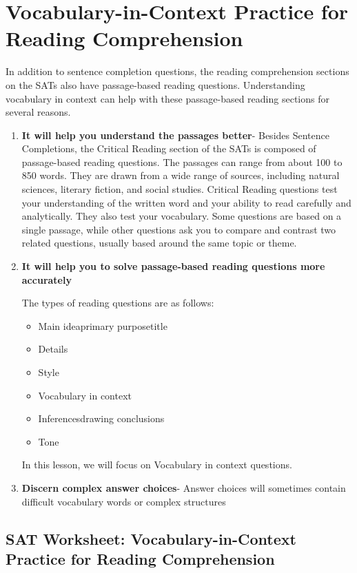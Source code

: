 \section{Vocabulary-in-Context Practice for Reading Comprehension}
In addition to sentence completion questions, the reading comprehension sections on the SATs also have passage-based reading questions. Understanding vocabulary in context can help with these passage-based reading sections for several reasons. 

\begin{enumerate}
\item \large{\textbf{It will help you understand the passages better}}- Besides Sentence Completions, the Critical Reading section of the SATs is composed of passage-based reading questions.  The passages can range from about 100 to 850 words.  They are drawn from a wide range of sources, including natural sciences, literary fiction, and social studies.  Critical Reading questions test your understanding of the written word and your ability to read carefully and analytically.  They also test your vocabulary.  Some questions are based on a single passage, while other questions ask you to compare and contrast two related questions, usually based around the same topic or theme.

\item \large{\textbf{It will help you to solve passage-based reading questions more accurately}}

The types of reading questions are as follows:

\begin{itemize}
\item Main idea\/primary purpose\/title
\item Details
\item Style
\item Vocabulary in context
\item Inferences\/drawing conclusions
\item Tone
\end{itemize}
 
In this lesson, we will focus on Vocabulary in context questions. 

\item \large{\textbf{Discern complex answer choices}}- Answer choices will sometimes contain difficult vocabulary words or complex structures 

\end{enumerate} 

\subsection{SAT Worksheet: Vocabulary-in-Context Practice for Reading Comprehension}

